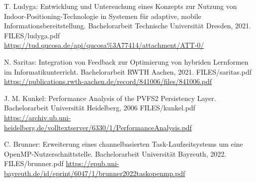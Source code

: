 \bigskip

{T. Ludyga: Entwicklung und Untersuchung eines Konzepts zur Nutzung von
Indoor-Positioning-Technologie in Systemen für adaptive, mobile Informationsbereitstellung.
Bachelorarbeit Technische Universität Dresden, 2021.
}
{FILES/ludyga.pdf}
{\href{https://tud.qucosa.de/api/qucosa\%3A77414/attachment/ATT-0/}{https://tud.qucosa.de/api/qucosa\%3A77414/attachment/ATT-0/}}



{N. Saritas: Integration von Feedback zur Optimierung von
hybriden Lernformen im Informatikunterricht.
Bachelorarbeit RWTH Aachen, 2021.
}
{FILES/saritas.pdf}
{\href{https://publications.rwth-aachen.de/record/841006/files/841006.pdf}{https://publications.rwth-aachen.de/record/841006/files/841006.pdf}}



{J. M. Kunkel: Performance Analysis of the PVFS2 Persistency Layer.
Bachelorarbeit Universität Heidelberg, 2006
}
{FILES/kunkel.pdf}
{\href{https://archiv.ub.uni-heidelberg.de/volltextserver/6330/1/PerformanceAnalysis.pdf}{https://archiv.ub.uni-heidelberg.de/volltextserver/6330/1/PerformanceAnalysis.pdf}
}\newline
{}



{C. Brunner: Erweiterung eines channelbasierten Task-Laufzeitsystems um eine
OpenMP-Nutzerschnittstelle. Bachelorarbeit Universität Bayreuth, 2022.
}
{FILES/brunner.pdf}
{%
\href{https://epub.uni-bayreuth.de/id/eprint/6047/1/brunner2022taskopenmp.pdf}{https://epub.uni-bayreuth.de/id/eprint/6047/1/\allowbreak\relax brunner2022taskopenmp.pdf}
}














